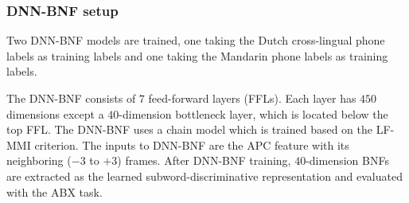 \documentclass[a4paper]{article}
\begin{document}


\subsubsection{DNN-BNF setup}
Two DNN-BNF models are trained, one taking the Dutch cross-lingual phone labels as training labels and one taking the Mandarin  phone labels as training labels. %

The DNN-BNF consists of $7$ feed-forward layers (FFLs). Each layer has $450$ dimensions except a $40$-dimension bottleneck layer, which is located below the top FFL. 
The DNN-BNF uses a chain model which is trained based on  the   LF-MMI criterion. 
The inputs to DNN-BNF are the APC  feature with its neighboring ($-3$ to $+3$) frames. 
After DNN-BNF training, $40$-dimension  BNFs are extracted as the learned subword-discriminative representation and evaluated with the ABX task.
\end{document}
